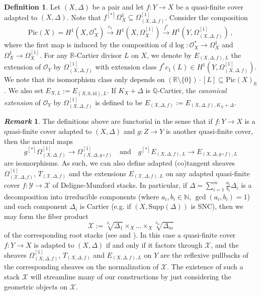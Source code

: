 \documentclass[12pt]{amsart}
\theoremstyle{definition}
\newtheorem{defn}[prop]{Definition}
\newtheorem{rem}[prop]{\it Remark}
\newcommand{\bR}{\mathbb{R}}
\newcommand{\bQ}{\mathbb{Q}}
\newcommand{\bN}{\mathbb{N}}
\newcommand{\cX}{\mathcal{X}}
\newcommand{\cY}{\mathcal{Y}}
\newcommand{\cO}{\mathcal{O}}
\newcommand{\rd}{\mathrm{d}}
\newcommand{\Supp}{\mathrm{Supp}}
\newcommand{\Pic}{\mathrm{Pic}}
\numberwithin{equation}{section}
\begin{document}
\begin{defn}
Let $(X,\Delta)$ be a pair and let $f\colon Y \to X$ be a quasi-finite cover adapted to $(X,\Delta)$. Note that $f^{[*]}\Omega^1_X \subseteq \Omega^{[1]}_{(X,\Delta,f)}$. Consider the composition
\[
\Pic(X)=H^1(X,\cO_X^*)\xrightarrow{c_1} H^1(X,\Omega_X^{[1]})\xrightarrow{f^*} H^1(Y,\Omega^{[1]}_{(X,\Delta,f)}) \, ,
\]
where the first map is induced by the composition of $\rd \log \colon \cO_X^*\to \Omega_X^1$ and $\Omega^1_X\to \Omega_X^{[1]}$. For any $\bR$-Cartier divisor $L$ on $X$, we denote by $E_{(X,\Delta,f),L}$ the extension of $\cO_Y$ by $\Omega^{[1]}_{(X,\Delta,f)}$ with extension class $f^*c_1(L) \in H^1(Y,\Omega^{[1]}_{(X,\Delta,f)})$. We note that its isomorphism class only depends on $(\bR\setminus\{0\})\cdot [L]\subseteq \Pic(X)_\bR$. We also set $E_{X,L}:=E_{(X,0,\mathrm{id}),L}$. If $K_X+\Delta$ is $\bQ$-Cartier, the \emph{canonical extension} of $\cO_Y$ by $\Omega^{[1]}_{(X,\Delta,f)}$ is defined to be $E_{(X,\Delta,f)}:=E_{(X,\Delta,f),K_X+\Delta}$.
\end{defn}

\begin{rem}
The definitions above are functorial in the sense that if $f\colon Y\to X$ is a quasi-finite cover adapted to $(X,\Delta)$ and $g\colon Z\to Y$ is another quasi-finite cover, then the natural maps 
\[
g^{[*]}\Omega^{[1]}_{(X,\Delta,f)} \to \Omega^{[1]}_{(X,\Delta,g\circ f)} \quad \mathrm{and} \quad g^{[*]}E_{(X,\Delta,f),L} \to E_{(X,\Delta,g\circ f),L}
\]
are isomorphisms. As such, we can also define adapted (co)tangent sheaves $\Omega^{[1]}_{(\cX,\Delta,f)}$, $T_{(\cX,\Delta,f)}$ and the extensions $E_{(\cX,\Delta,f),L}$ on any adapted quasi-finite cover $f\colon \cY\to \cX$ of Deligne-Mumford stacks. In particular, if $\Delta=\sum_{i=1}^m \frac{a_i}{b_i} \Delta_i$ is a decomposition into irreducible components (where $a_i,b_i\in \bN$, $\gcd(a_i,b_i)=1$) and each component $\Delta_i$ is Cartier (e.g. if $(X,\Supp(\Delta))$ is SNC), then we may form the fiber product 
\[
\cX:=\sqrt[b_1]{\Delta_1}\times_X \dots \times_X \sqrt[b_m]{\Delta_m}
\]
of the corresponding root stacks (see \cite[Appendix B]{AGV-GW-DM} and \cite[Section 2]{Cad-root-stack}). In this case a quasi-finite cover $f\colon Y\to X$ is adapted to $(X,\Delta)$ if and only if it factors through $\cX$, and the sheaves $\Omega^{[1]}_{(X,\Delta,f)}$, $T_{(X,\Delta,f)}$ and $E_{(X,\Delta,f),L}$ on $Y$ are the reflexive pullbacks of the corresponding sheaves on the normalization of $\cX$. The existence of such a stack $\cX$ will streamline many of our constructions by just considering the geometric objects on $\cX$.
\end{rem}
\end{document}
